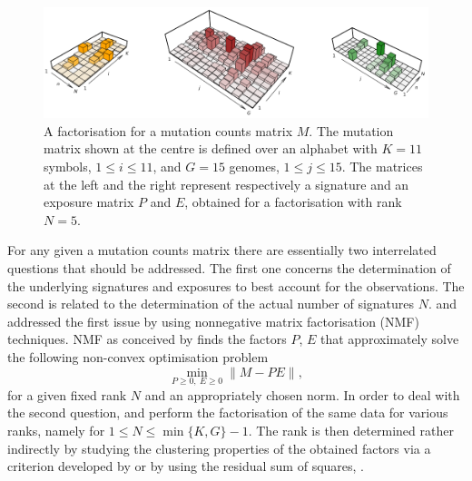 \documentclass{bioinfo}
\begin{document}
\begin{figure}
  \centering\includegraphics[width=13.5cm]{figs/f_t}
  \caption{\textrm{%
   A factorisation for a mutation counts matrix $M$. The
   mutation matrix shown at the centre is defined over an alphabet
   with $K=11$ symbols, $1 \leqslant i \leqslant 11$, and $G=15$
   genomes, $1\leqslant j\leqslant 15$. The matrices at the left and
   the right represent respectively a signature and an exposure matrix
   $P$ and $E$, obtained for a factorisation with rank $N=5$. 
   }
  }
 \label{fig:toyNMF}
\end{figure}


For any given a mutation counts matrix there are essentially two
interrelated questions that should be addressed. The first one
concerns the determination of the underlying signatures and exposures
to best account for the observations. The second is related to the
determination of the actual number of signatures $N$. \cite{NCell} and
\cite{A} addressed the first issue by using nonnegative matrix
factorisation (NMF) techniques.  NMF as conceived by \cite{LS} finds
the factors $P$, $E$ that approximately solve the following non-convex
optimisation problem
\begin{equation}
  \label{eqn:NMF}
    \min_{P\geqslant 0,\ E\geqslant 0}\|M - PE\|,
\end{equation}
for a given fixed rank $N$ and an appropriately chosen norm.
In order to deal with the second question, \cite{NCell} and \cite{A}
perform the factorisation of the same data for various ranks, namely
for $1 \leq N \leq \min\{K, G\}-1$. The rank is then determined rather 
indirectly by studying the clustering properties of the obtained
factors via a criterion developed by \cite{BTGM} or by using the
residual sum of squares, \cite{HMSG}.
\end{document}
